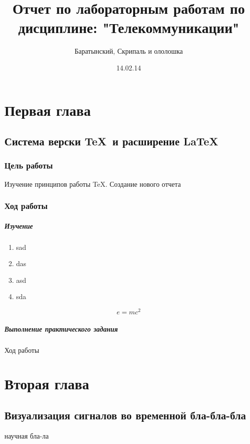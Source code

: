 \documentclass[10pt,a4paper]{book}
\author{Баратынский, Скрипаль и ололошка}
\title{Отчет по лабораторным работам по дисциплине: "Телекоммуникации"}
\date{14.02.14}
\begin{document}
\maketitle
\tableofcontents
\pagebreak
\chapter{Первая глава}
\section{Система верски \TeX\ и расширение \LaTeX}
\subsection{Цель работы}
Изучение принципов работы \TeX. Создание нового отчета
\subsection{Ход работы}
\paragraph{Изучение}
\begin{enumerate}
\item sad
\item das
\item asd
\item sda
\end{enumerate}
\begin{displaymath}
e =mc^2
\end{displaymath}
\paragraph{Выполнение практического задания}
Ход работы
\chapter{Вторая глава}
\section{Визуализация сигналов во временной бла-бла-бла}
научная бла-ла
\end{document}

